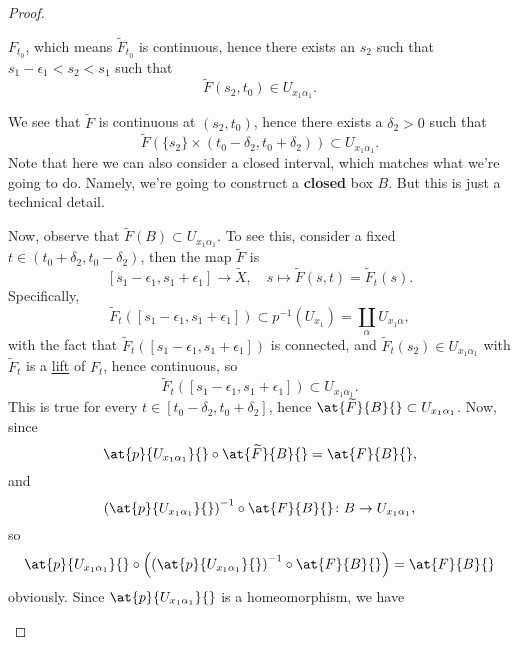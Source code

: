 \begin{proof}
\begin{enumerate}[(1)]
		      \(F_{t_0}\), which means \(\widetilde{F} _{t_0}\) is continuous, hence there exists an \(s_{2} \) such that \(s_{1}-\epsilon _1<s_{2}< s_1  \) such that
		      \[
			      \widetilde{F} (s_2, t_0)\in U_{x_1 \alpha _1}.
		      \]
		      \begin{figure}[H]
			      \centering
			      \label{fig:pf:col:lec14-8}
		      \end{figure}
		      We see that \(\widetilde{F} \) is continuous at \((s_2, t_0)\), hence there exists a \(\delta _2>0\) such that
		      \[
			      \widetilde{F} \left(\{s_2\}\times (t_0 - \delta _2, t_0 + \delta_2)\right)\subset U_{x_1\alpha _1}.
		      \]
		      Note that here we can also consider a closed interval, which matches what we're going to do. Namely, we're going to construct a
		      \textbf{closed} box \(B\). But this is just a technical detail.
		      \begin{figure}[H]
			      \centering
			      \label{fig:pf:col:lec14-9}
		      \end{figure}
		      Now, observe that \(\widetilde{F} (B)\subset U_{x_1 \alpha _1}\). To see this, consider a fixed \(t\in (t_0 + \delta _2, t_0 - \delta _2)\), then the map \(\widetilde{F} \) is
		      \[
			      [s_{1}-\epsilon _1, s_{1}+\epsilon _1]\to \widetilde{X} ,\quad s\mapsto \widetilde{F} (s, t) = \widetilde{F} _{t} (s).
		      \]
		      Specifically,
		      \[
			      \widetilde{F} _{t} ([s_{1}-\epsilon _1, s_{1}+\epsilon _1]) \subset p^{-1} (U_{x_1}) = \coprod\limits_{\alpha}U_{x_1 \alpha },
		      \]
		      with the fact that \(\widetilde{F} _{t} ([s_{1}-\epsilon _1, s_{1}+\epsilon _1])\) is connected, and \(\widetilde{F} _{t} (s_2)\in U_{x_1 \alpha _1}\) with
		      \(\widetilde{F} _t\) is a \hyperref[def:lift]{lift} of \(F_{t} \), hence continuous, so
		      \[
			      \widetilde{F} _{t} ([s_{1}-\epsilon _1, s_{1}+\epsilon _1])\subset U_{x_1 \alpha _1}.
		      \]
		      This is true for every \(t\in [t_0-\delta _2, t_0 + \delta _2]\), hence \(\at{\widetilde{F} }{B}{} \subset U_{x_1 \alpha _1}\). Now, since
		      \[
			      \at{p}{U_{x_1 \alpha _1}}{}\circ \at{\widetilde{F} }{B}{} = \at{F}{B}{},
		      \]
		      and
		      \[
			      \left(\at{p}{U_{x_1 \alpha _1}}{} \right)^{-1} \circ \at{F}{B}{} \colon B\to U_{x_1 \alpha _1},
		      \]
		      so
		      \[
			      \at{p}{U_{x_1 \alpha _1}}{} \circ \left(\left(\at{p}{U_{x_1 \alpha _1}}{} \right)^{-1} \circ \at{F}{B}{}\right) = \at{F}{B}{}
		      \]
		      obviously. Since \(\at{p}{U_{x_1 \alpha _1}}{}\) is a homeomorphism, we have

\end{enumerate}
\end{proof}
